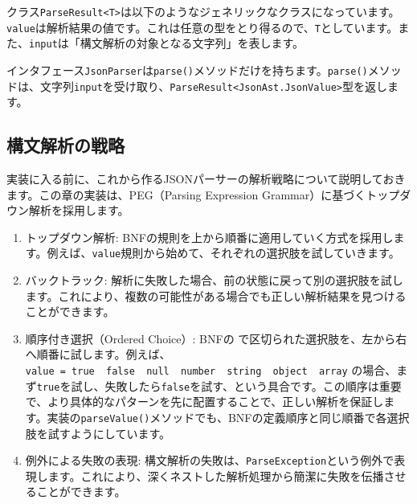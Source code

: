 クラス\texttt{ParseResult\textless{}T\textgreater{}}は以下のようなジェネリックなクラスになっています。\texttt{value}は解析結果の値です。これは任意の型をとり得るので、\texttt{T}としています。また、\texttt{input}は「構文解析の対象となる文字列」を表します。

\begin{Shaded}
\begin{Highlighting}[]
\end{Highlighting}
\end{Shaded}

インタフェース\texttt{JsonParser}は\texttt{parse()}メソッドだけを持ちます。\texttt{parse()}メソッドは、文字列\texttt{input}を受け取り、\texttt{ParseResult\textless{}JsonAst.JsonValue\textgreater{}}型を返します。

\hypertarget{chapter3-ux69cbux6587ux89e3ux6790ux306eux6226ux7565}{%
\subsection{構文解析の戦略}\label{chapter3-ux69cbux6587ux89e3ux6790ux306eux6226ux7565}}

実装に入る前に、これから作るJSONパーサーの解析戦略について説明しておきます。この章の実装は、PEG（Parsing
Expression Grammar）に基づくトップダウン解析を採用します。

\begin{enumerate}
\def\labelenumi{\arabic{enumi}.}
\item
  トップダウン解析:
  BNFの規則を上から順番に適用していく方式を採用します。例えば、\texttt{value}規則から始めて、それぞれの選択肢を試していきます。
\item
  バックトラック:
  解析に失敗した場合、前の状態に戻って別の選択肢を試します。これにより、複数の可能性がある場合でも正しい解析結果を見つけることができます。
\item
  順序付き選択（Ordered Choice）: BNFの \texttt{\textbar{}}
  で区切られた選択肢を、左から右へ順番に試します。例えば、\texttt{value\ =\ true\ \textbar{}\ false\ \textbar{}\ null\ \textbar{}\ number\ \textbar{}\ string\ \textbar{}\ object\ \textbar{}\ array}
  の場合、まず\texttt{true}を試し、失敗したら\texttt{false}を試す、という具合です。この順序は重要で、より具体的なパターンを先に配置することで、正しい解析を保証します。実装の\texttt{parseValue()}メソッドでも、BNFの定義順序と同じ順番で各選択肢を試すようにしています。
\item
  例外による失敗の表現:
  構文解析の失敗は、\texttt{ParseException}という例外で表現します。これにより、深くネストした解析処理から簡潔に失敗を伝播させることができます。
\end{enumerate}

